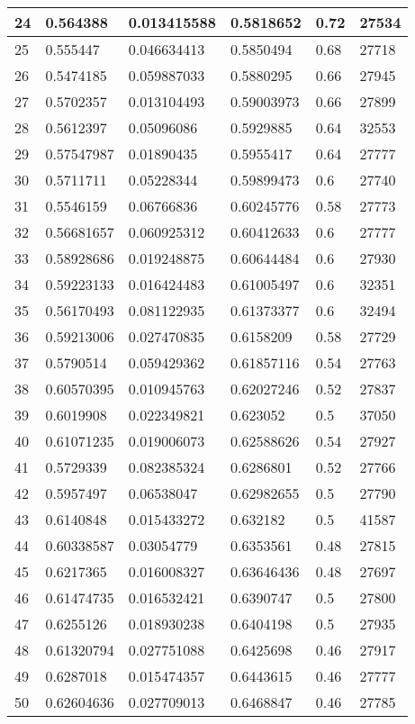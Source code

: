 \begin{longtable}{|l|l|l|l|l|l|}
24 & 0.564388 & 0.013415588 & 0.5818652 & 0.72 & 27534 \\ \hline 
25 & 0.555447 & 0.046634413 & 0.5850494 & 0.68 & 27718 \\ \hline 
26 & 0.5474185 & 0.059887033 & 0.5880295 & 0.66 & 27945 \\ \hline 
27 & 0.5702357 & 0.013104493 & 0.59003973 & 0.66 & 27899 \\ \hline 
28 & 0.5612397 & 0.05096086 & 0.5929885 & 0.64 & 32553 \\ \hline 
29 & 0.57547987 & 0.01890435 & 0.5955417 & 0.64 & 27777 \\ \hline 
30 & 0.5711711 & 0.05228344 & 0.59899473 & 0.6 & 27740 \\ \hline 
31 & 0.5546159 & 0.06766836 & 0.60245776 & 0.58 & 27773 \\ \hline 
32 & 0.56681657 & 0.060925312 & 0.60412633 & 0.6 & 27777 \\ \hline 
33 & 0.58928686 & 0.019248875 & 0.60644484 & 0.6 & 27930 \\ \hline 
34 & 0.59223133 & 0.016424483 & 0.61005497 & 0.6 & 32351 \\ \hline 
35 & 0.56170493 & 0.081122935 & 0.61373377 & 0.6 & 32494 \\ \hline 
36 & 0.59213006 & 0.027470835 & 0.6158209 & 0.58 & 27729 \\ \hline 
37 & 0.5790514 & 0.059429362 & 0.61857116 & 0.54 & 27763 \\ \hline 
38 & 0.60570395 & 0.010945763 & 0.62027246 & 0.52 & 27837 \\ \hline 
39 & 0.6019908 & 0.022349821 & 0.623052 & 0.5 & 37050 \\ \hline 
40 & 0.61071235 & 0.019006073 & 0.62588626 & 0.54 & 27927 \\ \hline 
41 & 0.5729339 & 0.082385324 & 0.6286801 & 0.52 & 27766 \\ \hline 
42 & 0.5957497 & 0.06538047 & 0.62982655 & 0.5 & 27790 \\ \hline 
43 & 0.6140848 & 0.015433272 & 0.632182 & 0.5 & 41587 \\ \hline 
44 & 0.60338587 & 0.03054779 & 0.6353561 & 0.48 & 27815 \\ \hline 
45 & 0.6217365 & 0.016008327 & 0.63646436 & 0.48 & 27697 \\ \hline 
46 & 0.61474735 & 0.016532421 & 0.6390747 & 0.5 & 27800 \\ \hline 
47 & 0.6255126 & 0.018930238 & 0.6404198 & 0.5 & 27935 \\ \hline 
48 & 0.61320794 & 0.027751088 & 0.6425698 & 0.46 & 27917 \\ \hline 
49 & 0.6287018 & 0.015474357 & 0.6443615 & 0.46 & 27777 \\ \hline 
50 & 0.62604636 & 0.027709013 & 0.6468847 & 0.46 & 27785 \\ \hline 
\end{longtable}